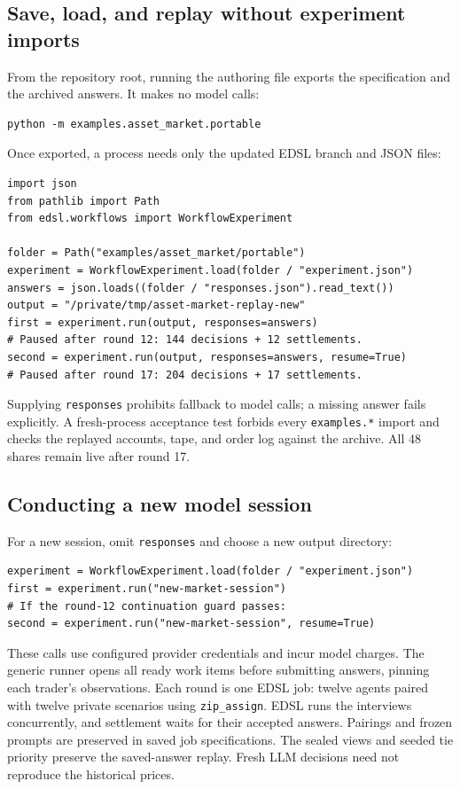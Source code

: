\documentclass[11pt,letterpaper]{article}
\newcommand{\code}[1]{\texttt{\small #1}}
\begin{document}
\subsection{Save, load, and replay without experiment imports}
From the repository root, running the authoring file exports the specification
and the archived answers. It makes no model calls:
\begin{lstlisting}[language={},numbers=none]
python -m examples.asset_market.portable
\end{lstlisting}
Once exported, a process needs only the updated EDSL branch and JSON files:
\par\noindent
\begin{minipage}{\linewidth}
\begin{lstlisting}[numbers=none,breaklines=true]
import json
from pathlib import Path
from edsl.workflows import WorkflowExperiment

folder = Path("examples/asset_market/portable")
experiment = WorkflowExperiment.load(folder / "experiment.json")
answers = json.loads((folder / "responses.json").read_text())
output = "/private/tmp/asset-market-replay-new"
first = experiment.run(output, responses=answers)
# Paused after round 12: 144 decisions + 12 settlements.
second = experiment.run(output, responses=answers, resume=True)
# Paused after round 17: 204 decisions + 17 settlements.
\end{lstlisting}
\end{minipage}
\par
Supplying \code{responses} prohibits fallback to model calls; a missing
answer fails explicitly. A fresh-process acceptance test forbids every
\code{examples.*} import and checks the replayed accounts, tape, and order
log against the archive. All 48 shares remain live after round 17.

\subsection{Conducting a new model session}
For a new session, omit \code{responses} and choose a new output directory:
\begin{lstlisting}[numbers=none]
experiment = WorkflowExperiment.load(folder / "experiment.json")
first = experiment.run("new-market-session")
# If the round-12 continuation guard passes:
second = experiment.run("new-market-session", resume=True)
\end{lstlisting}
These calls use configured provider credentials and incur model charges.
The generic runner opens all ready work items before submitting answers,
pinning each trader's observations. Each round is one EDSL job: twelve agents
paired with twelve private scenarios using \code{zip\_assign}. EDSL runs the
interviews concurrently, and settlement waits for their accepted answers.
Pairings and frozen prompts are preserved in saved job specifications.
The sealed views and seeded tie priority preserve the saved-answer replay.
Fresh LLM decisions need not reproduce the historical prices.
\end{document}

